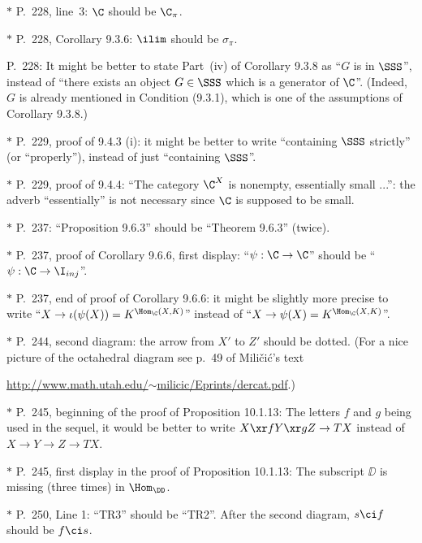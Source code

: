 \documentclass[12pt]{article}
\theoremstyle{remark}
\theoremstyle{definition}
\begin{document}
\nn$*$ P.~228, line~3: $\C$ should be $\C_\pi$.

\nn$*$ P.~228, Corollary 9.3.6: $\ilim$ should be $\sigma_\pi$.

\begin{s}
P.~228: It might be better to state Part~(iv) of Corollary 9.3.8 as ``$G$ is in $\SSS$'', instead of ``there exists an object $G\in\SSS$ which is a generator of $\C$''. (Indeed, $G$ is already mentioned in Condition (9.3.1), which is one of the assumptions of Corollary 9.3.8.)
\end{s}

\nn$*$ P.~229, proof of 9.4.3 (i): it might be better to write ``containing $\SSS$ strictly'' (or ``properly''), instead of just ``containing $\SSS$''. 

\nn$*$ P.~229, proof of 9.4.4: ``The category $\C^X$ is nonempty, essentially small ...'': the adverb ``essentially'' is not necessary since $\C$ is supposed to be small. 


\nn$*$ P.~237: ``Proposition 9.6.3'' should be ``Theorem 9.6.3'' (twice). 

\nn$*$ P.~237, proof of Corollary 9.6.6, first display: ``$\psi:\C\to\C$'' should be ``$\psi:\C\to\I_{inj}$''. 

\nn$*$ P.~237, end of proof of Corollary 9.6.6: it might be slightly more precise to write ``$X\to\iota(\psi(X))=K^{\Hom_\C(X,K)}$'' instead of ``$X\to\psi(X)=K^{\Hom_\C(X,K)}$''.

\nn$*$ P.~244, second diagram: the arrow from $X'$ to $Z'$ should be dotted. (For a nice picture of the octahedral diagram see p.~49 of Mili\v{c}i\'c's text

\href{http://www.math.utah.edu/~milicic/Eprints/dercat.pdf}{http://www.math.utah.edu/$\sim$milicic/Eprints/dercat.pdf}.)

\nn$*$ P.~245, beginning of the proof of Proposition 10.1.13: The letters $f$ and $g$ being used in the sequel, it would be better to write $X\xr fY\xr gZ\to TX$ instead of $X\to Y\to Z\to TX$. 

\nn$*$ P.~245, first display in the proof of Proposition 10.1.13: The subscript $\DD$ is missing (three times) in $\Hom_\DD$.

\nn$*$ P.~250, Line 1: ``TR3'' should be ``TR2''. After the second diagram, $s\ci f$ should be $f\ci s$.
\end{document}
